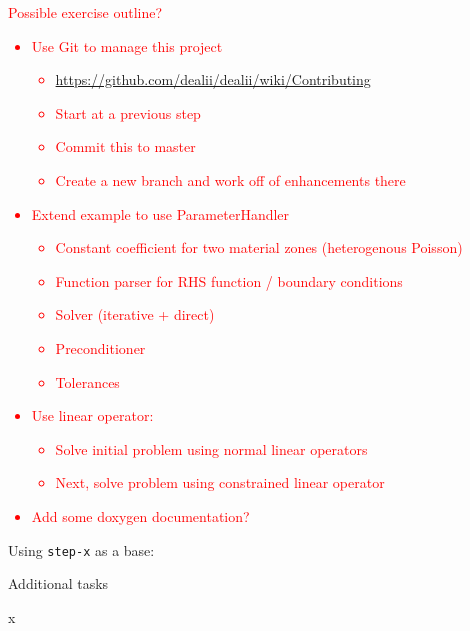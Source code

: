 \documentclass[11pt,answers]{exam}
\newcommand{\FINISHME}[1]{\textcolor{red}{#1}}
\begin{document}
\begin{questions}

\question \FINISHME{Possible exercise outline?}
\FINISHME{
\begin{itemize}
\item Use Git to manage this project
  \begin{itemize}
  \item \url{https://github.com/dealii/dealii/wiki/Contributing}
  \item Start at a previous step
  \item Commit this to master
  \item Create a new branch and work off of enhancements there
  \end{itemize}
\item Extend example to use ParameterHandler
  \begin{itemize}
  \item Constant coefficient for two material zones (heterogenous Poisson)
  \item Function parser for RHS function / boundary conditions
  \item Solver (iterative + direct)
  \item Preconditioner
  \item Tolerances
  \end{itemize}
\item Use linear operator:
  \begin{itemize}
  \item Solve initial problem using normal linear operators
  \item Next, solve problem using constrained linear operator
  \end{itemize}
\item Add some doxygen documentation?
\end{itemize}
}

\question Using \verb|step-x| as a base:

\question Additional tasks
\begin{parts}
\bonuspart x
\end{parts}

\end{questions}


\end{document}
